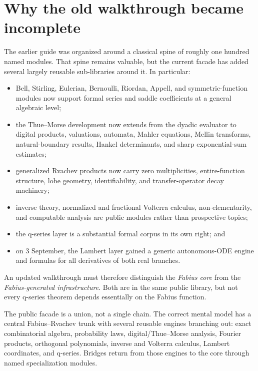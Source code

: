 \documentclass[11pt,oneside]{report}
\theoremstyle{definition}
\theoremstyle{remark}
\begin{document}
\section{Why the old walkthrough became incomplete}
The earlier guide was organized around a classical spine of roughly one
hundred named modules.  That spine remains valuable, but the current facade has
added several largely reusable sub-libraries around it.  In particular:
\begin{itemize}
  \item Bell, Stirling, Eulerian, Bernoulli, Riordan, Appell, and symmetric-function modules now support formal series and saddle coefficients at a general algebraic level;
  \item the Thue--Morse development now extends from the dyadic evaluator to digital products, valuations, automata, Mahler equations, Mellin transforms, natural-boundary results, Hankel determinants, and sharp exponential-sum estimates;
  \item generalized Rvachev products now carry zero multiplicities, entire-function structure, lobe geometry, identifiability, and transfer-operator decay machinery;
  \item inverse theory, normalized and fractional Volterra calculus, non-elementarity, and computable analysis are public modules rather than prospective topics;
  \item the q-series layer is a substantial formal corpus in its own right; and
  \item on 3 September, the Lambert layer gained a generic autonomous-ODE engine and formulas for all derivatives of both real branches.
\end{itemize}
An updated walkthrough must therefore distinguish the \emph{Fabius core} from
the \emph{Fabius-generated infrastructure}.  Both are in the same public
library, but not every q-series theorem depends essentially on the Fabius
function.

\begin{architecture}
The public facade is a union, not a single chain.  The correct mental model has
a central Fabius--Rvachev trunk with several reusable engines branching out:
exact combinatorial algebra, probability laws, digital/Thue--Morse analysis,
Fourier products, orthogonal polynomials, inverse and Volterra calculus,
Lambert coordinates, and q-series.  Bridges return from those engines to the
core through named specialization modules.
\end{architecture}
\end{document}
